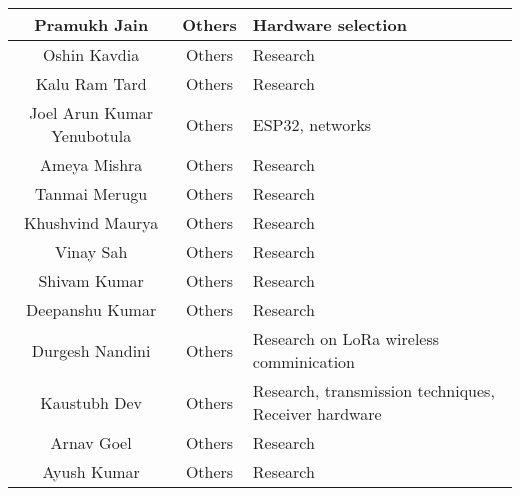 \begin{center}
\begin{longtable}{ | c | c | m{6cm} | }
        \hline
        Pramukh Jain               & Others            & Hardware selection                                                      \\
        \hline
        Oshin Kavdia               & Others            & Research                                                                \\
        \hline
        Kalu Ram Tard              & Others            & Research                                                                \\
        \hline
        Joel Arun Kumar Yenubotula & Others            & ESP32, networks                                                         \\
        \hline
        Ameya Mishra               & Others            & Research                                                                \\
        \hline
        Tanmai Merugu              & Others            & Research                                                                \\
        \hline
        Khushvind Maurya           & Others            & Research                                                                \\
        \hline
        Vinay Sah                  & Others            & Research                                                                \\
        \hline
        Shivam Kumar               & Others            & Research                                                                \\
        \hline
        Deepanshu Kumar            & Others            & Research                                                                \\
        \hline
        Durgesh Nandini            & Others            & Research on LoRa wireless comminication                                 \\
        \hline
        Kaustubh Dev               & Others            & Research, transmission techniques, Receiver hardware                    \\
        \hline
        Arnav Goel                 & Others            & Research                                                                \\
        \hline
        Ayush Kumar                & Others            & Research                                                                \\

\end{longtable}
\end{center}

